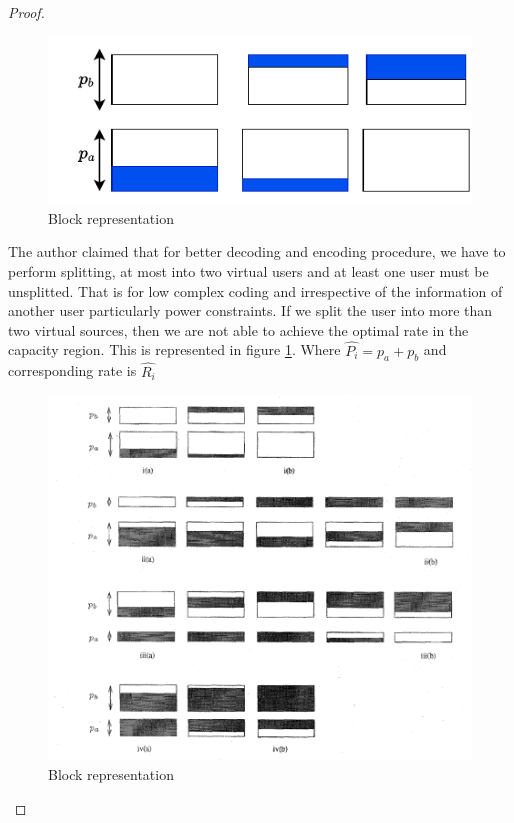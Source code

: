 \documentclass{article}
\begin{document}
\begin{proof}
\begin{figure}[htb!]
	\centering
	\includegraphics[height=.20\textheight]{pic_8.pdf}
	\caption{Block representation}
	\label{fig7}
\end{figure}
The author claimed that for better decoding and encoding procedure, we have to perform splitting, at most into two virtual users and at least one user must be unsplitted. That is for low complex coding and irrespective of the information of another user particularly power constraints. If we split the user into more than two virtual sources, then we are not able to achieve the optimal rate in the capacity region. This is represented in figure \ref{fig7}. Where $\hat{P_i} = p_a + p_b $ and corresponding rate is  $\hat{R_i}$
\begin{figure}[htb!]
	\centering
	\includegraphics[height=.3\textheight]{fig_9.png}
	\caption{Block representation}
	\label{fig8}
\end{figure}
\end{proof}
\end{document}
